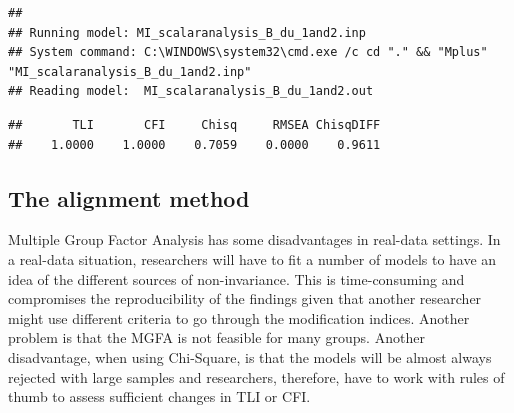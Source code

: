 \documentclass[]{book}
\newenvironment{Shaded}{\begin{snugshade}}{\end{snugshade}}
\newcommand{\DataTypeTok}[1]{\textcolor[rgb]{0.13,0.29,0.53}{#1}}
\newcommand{\KeywordTok}[1]{\textcolor[rgb]{0.13,0.29,0.53}{\textbf{#1}}}
\newcommand{\NormalTok}[1]{#1}
\newcommand{\OperatorTok}[1]{\textcolor[rgb]{0.81,0.36,0.00}{\textbf{#1}}}
\begin{document}
\begin{verbatim}
## 
## Running model: MI_scalaranalysis_B_du_1and2.inp 
## System command: C:\WINDOWS\system32\cmd.exe /c cd "." && "Mplus" "MI_scalaranalysis_B_du_1and2.inp" 
## Reading model:  MI_scalaranalysis_B_du_1and2.out
\end{verbatim}

\begin{Shaded}
\end{Shaded}

\begin{verbatim}
##       TLI       CFI     Chisq     RMSEA ChisqDIFF 
##    1.0000    1.0000    0.7059    0.0000    0.9611
\end{verbatim}

\hypertarget{the-alignment-method}{%
\subsection{The alignment method}\label{the-alignment-method}}

Multiple Group Factor Analysis has some disadvantages in real-data settings. In a real-data situation, researchers will have to fit a number of models to have an idea of the different sources of non-invariance. This is time-consuming and compromises the reproducibility of the findings given that another researcher might use different criteria to go through the modification indices. Another problem is that the MGFA is not feasible for many groups. Another disadvantage, when using Chi-Square, is that the models will be almost always rejected with large samples and researchers, therefore, have to work with rules of thumb to assess sufficient changes in TLI or CFI.
\end{document}

